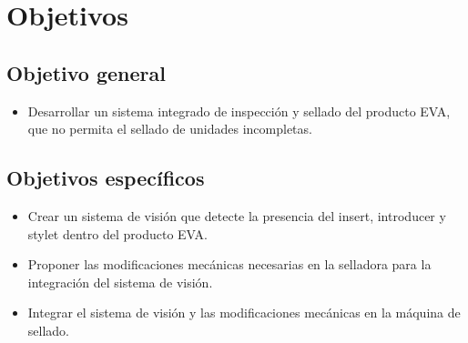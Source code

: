 \documentclass[12pt, twoside, letterpaper]{book}
\begin{document}
\newpage
\section{Objetivos}

\subsection{Objetivo general}

\begin{itemize}

\item Desarrollar un sistema integrado de inspecci\'on y sellado del producto EVA,
que no permita el sellado de unidades incompletas.


\end{itemize}

\subsection{Objetivos espec\'ificos}

\begin{itemize}

    \item Crear un sistema de visi\'on que detecte la presencia del insert, introducer
    y stylet dentro del producto EVA.
    
    
    \item Proponer las modificaciones mec\'anicas necesarias en la selladora para
    la integraci\'on del sistema de visi\'on.
    
    
    \item Integrar el sistema de visi\'on y las modificaciones mec\'anicas en la
    m\'aquina de sellado.
    

\end{itemize}
\end{document}

